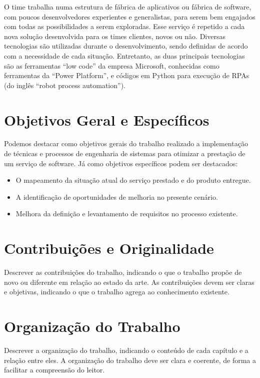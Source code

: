 	O time trabalha numa estrutura de fábrica de aplicativos ou fábrica de software, 
	com poucos desenvolvedores experientes e generalistas, para serem bem 
	engajados com todas as possibilidades a serem exploradas. Esse serviço é repetido 
	a cada nova solução desenvolvida para os times clientes, novos ou não. 
	Diversas tecnologias são utilizadas durante o desenvolvimento, sendo definidas de 
	acordo com a necessidade de cada situação. Entretanto, as duas principais 
	tecnologias são as ferramentas “low code” da empresa Microsoft, conhecidas como 
	ferramentas da “Power Platform”, e códigos em Python para execução de RPAs (do 
	inglês “robot process automation”). 

	\section{Objetivos Geral e Específicos}\label{sec:introducao:objetivos}

		Podemos destacar como objetivos gerais do trabalho realizado a implementação de 
		técnicas e processos de engenharia de sistemas para otimizar a prestação de um 
		serviço de software. 
		Já como objetivos específicos podem ser destacados: 
		\begin{itemize}
			\item O mapeamento da situação atual do serviço prestado e do produto entregue.
			\item A identificação de oportunidades de melhoria no presente cenário. 
			\item Melhora da definição e levantamento de requisitos no processo existente. 
		\end{itemize}
 		
 		

	\section{Contribuições e Originalidade}\label{sec:introducao:contribuicoes}

		Descrever as contribuições do trabalho, indicando o que o trabalho
		propõe de novo ou diferente em relação ao estado da arte. As contribuições
		devem ser claras e objetivas, indicando o que o trabalho agrega ao conhecimento
		existente.
	
	\section{Organização do Trabalho}\label{sec:introducao:organizacao}

		Descrever a organização do trabalho, indicando o conteúdo de cada capítulo
		e a relação entre eles. A organização do trabalho deve ser clara e
		coerente, de forma a facilitar a compreensão do leitor.
